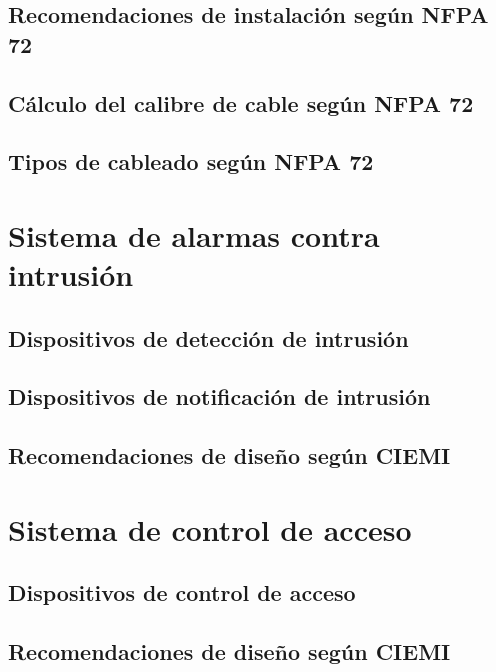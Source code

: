 \subsection{Recomendaciones de instalación según NFPA 72}



\subsection{Cálculo del calibre de cable según NFPA 72}





\subsection{Tipos de cableado según NFPA 72}




\newpage

\section{Sistema de alarmas contra intrusión}


\subsection{Dispositivos de detección de intrusión}

\subsection{Dispositivos de notificación de intrusión}

\subsection{Recomendaciones de diseño según CIEMI}


\newpage


\section{Sistema de control de acceso}


\subsection{Dispositivos de control de acceso}

\subsection{Recomendaciones de diseño según CIEMI}


